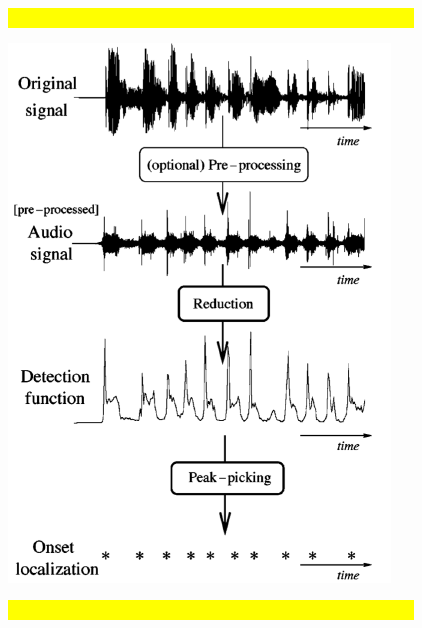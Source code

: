 \documentclass[letterpaper, 12pt]{article}
\begin{document}
			\begin{minipage}{0.35\textwidth}
				\hl{\ \ \ \ \ \ \ \ \ \ \ \ \ \ \ \ \ \ \ \ \ \ \ \ \ \ \ \ \ \ \ \ \ \ \ \ \ \ \ \ \ \ \ \ \ \ \ \ \ \ \ \ \ \ \ \ \ \ }
				\begin{center}				
					\includegraphics[width=\textwidth]{Images/onset}
				\end{center}
				\hl{\ \ \ \ \ \ \ \ \ \ \ \ \ \ \ \ \ \ \ \ \ \ \ \ \ \ \ \ \ \ \ \ \ \ \ \ \ \ \ \ \ \ \ \ \ \ \ \ \ \ \ \ \ \ \ \ \ \ }
			\end{minipage}~\\~\\~\\
\end{document}
